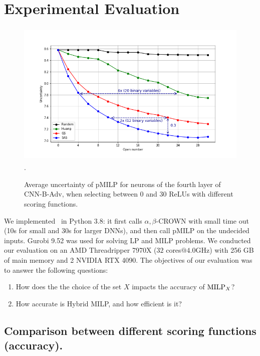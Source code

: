 \section{Experimental Evaluation}

\begin{figure}[b!]
	\centering
	\includegraphics[height=7cm]{CNN-B-ADV_layer7_comparison_image85.png}.
	\caption{Average uncertainty of pMILP for neurons of the fourth layer of CNN-B-Adv, 
	when selecting between 0 and 30 ReLUs with different scoring functions.}
	\label{fig_table3}
\end{figure}


%
We implemented \toolname\ in Python 3.8: it first calls $\alpha,\beta$-CROWN with small time out (10s for small and 30s for larger DNNs), and then call pMILP on the undecided inputs.
Gurobi 9.52 was used for solving LP and MILP problems. We conducted our evaluation on an AMD Threadripper 7970X  ($32$ cores$@4.0$GHz) with 256 GB of main memory and 2 NVIDIA RTX 4090. The  objectives of our evaluation was to answer the following  questions:
\vspace{-0.1cm}

\begin{enumerate}
	\item How does the the choice of the set $X$ impacts the accuracy of ${\textrm{MILP}}_X$? 
	\item How accurate is Hybrid MILP, and how efficient is it?
\end{enumerate}


\subsection{Comparison between different scoring functions (accuracy).}

